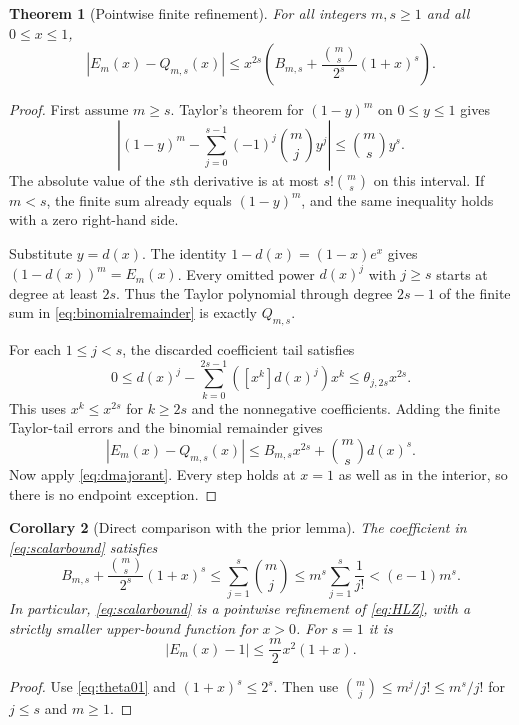 \documentclass[11pt,a4paper]{article}
\newtheorem{theorem}{Theorem}[section]
\newtheorem{corollary}[theorem]{Corollary}
\theoremstyle{definition}
\begin{document}
\begin{theorem}[Pointwise finite refinement]\label{thm:scalar}
For all integers $m,s\ge1$ and all $0\le x\le1$,
\begin{equation}\label{eq:scalarbound}
 |E_m(x)-Q_{m,s}(x)|
 \le x^{2s}\left(
 B_{m,s}+\frac{\binom ms}{2^s}(1+x)^s\right).
\end{equation}
\end{theorem}
\begin{proof}
First assume $m\ge s$. Taylor's theorem for $(1-y)^m$ on $0\le y\le1$
gives
\begin{equation}\label{eq:binomialremainder}
 \left|(1-y)^m-\sum_{j=0}^{s-1}(-1)^j\binom mj y^j\right|
 \le\binom ms y^s.
\end{equation}
The absolute value of the $s$th derivative is at most
$s!\binom ms$ on this interval. If $m<s$, the finite sum already equals
$(1-y)^m$, and the same inequality holds with a zero right-hand side.

Substitute $y=d(x)$. The identity $1-d(x)=(1-x)e^x$ gives
$(1-d(x))^m=E_m(x)$. Every omitted power $d(x)^j$ with $j\ge s$
starts at degree at least $2s$. Thus the Taylor polynomial through degree
$2s-1$ of the finite sum in \eqref{eq:binomialremainder} is exactly
$Q_{m,s}$.

For each $1\le j<s$, the discarded coefficient tail satisfies
\[
 0\le d(x)^j-\sum_{k=0}^{2s-1}([x^k]d(x)^j)x^k
 \le\theta_{j,2s}x^{2s}.
\]
This uses $x^k\le x^{2s}$ for $k\ge2s$ and the nonnegative coefficients.
Adding the finite Taylor-tail errors and the binomial remainder gives
\[
 |E_m(x)-Q_{m,s}(x)|
 \le B_{m,s}x^{2s}+\binom ms d(x)^s.
\]
Now apply \eqref{eq:dmajorant}. Every step holds at $x=1$ as well as in
the interior, so there is no endpoint exception.
\end{proof}

\begin{corollary}[Direct comparison with the prior lemma]\label{cor:comparison}
The coefficient in \eqref{eq:scalarbound} satisfies
\begin{equation}\label{eq:coarsecoef}
 B_{m,s}+\frac{\binom ms}{2^s}(1+x)^s
 \le\sum_{j=1}^s\binom mj
 \le m^s\sum_{j=1}^s\frac1{j!}
 <(e-1)m^s.
\end{equation}
In particular, \eqref{eq:scalarbound} is a pointwise refinement of
\eqref{eq:HLZ}, with a strictly smaller upper-bound function for $x>0$.
For $s=1$ it is
\begin{equation}\label{eq:s1scalar}
 |E_m(x)-1|\le\frac m2x^2(1+x).
\end{equation}
\end{corollary}
\begin{proof}
Use \eqref{eq:theta01} and $(1+x)^s\le2^s$. Then use
$\binom mj\le m^j/j!\le m^s/j!$ for $j\le s$ and $m\ge1$.
\end{proof}
\end{document}
